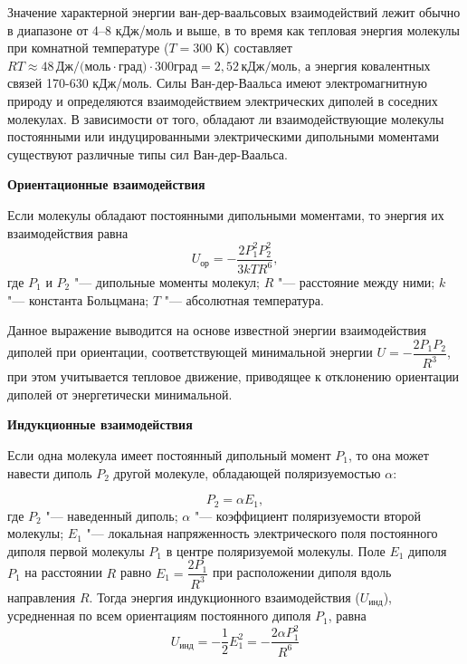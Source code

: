 \documentclass[12pt,a4paper,oneside]{book}
\begin{document}
Значение характерной энергии ван-дер-ваальсовых взаимодействий лежит обычно в диапазоне от 4--8 кДж/моль и выше, в то время как тепловая энергия молекулы при комнатной температуре ($T = 300$ К) составляет $RT \approx 48 \, \text{Дж/(моль} \cdot \text{град)} \cdot 300  \text{град} = 2,52 \, \text{кДж/моль}$, а энергия ковалентных связей 170-630 кДж/моль. Силы Ван-дер-Ваальса имеют электромагнитную природу и определяются взаимодействием электрических диполей в соседних молекулах. В зависимости от того, обладают ли взаимодействующие молекулы постоянными или индуцированными электрическими дипольными моментами существуют различные типы сил Ван-дер-Ваальса.

\textbf{Ориентационные взаимодействия}

Если молекулы обладают постоянными дипольными моментами, то энергия их взаимодействия равна 
\begin{equation}
\label{or} 
 U_\text{ор} = - \dfrac{2P_1^2 P_2^2}{3 k T R^6},
 \end{equation} 
где $ P_1 $ и $ P_2 $ "--- дипольные моменты молекул; $ R $ "--- расстояние между ними; $ k $ "--- константа Больцмана; $T$ "--- абсолютная температура. 

Данное выражение выводится на основе известной энергии взаимодействия диполей при ориентации, соответствующей минимальной энергии $ U = - \dfrac{2P_1 P_2}{ R^3}$, при этом учитывается тепловое движение, приводящее к отклонению ориентации диполей от энергетически минимальной.

\textbf{Индукционные взаимодействия}

Если одна молекула имеет постоянный дипольный момент  $ P_1 $, то она может навести диполь $ P_2 $  другой молекуле, обладающей поляризуемостью $\alpha$:

\begin{equation}
	P_2 = \alpha E_1,
\end{equation}
где $P_2$ "--- наведенный диполь; $ \alpha $ "--- коэффициент поляризуемости второй молекулы; $ E_1 $ "--- локальная напряженность электрического поля постоянного диполя первой молекулы $ P_1 $ в центре поляризуемой молекулы. Поле $ E_1 $ диполя $ P_1 $ на расстоянии $ R $ равно $ E_1 = \dfrac{2 P_1}{R^3} $ при расположении диполя вдоль направления $R$. Тогда энергия индукционного взаимодействия ($ U_{\text{инд}} $), усредненная по всем ориентациям постоянного
диполя $ P_1 $, равна
\begin{equation}
\label{ind} 
U_{\text{инд}} = - \frac{1}{2} E_1^2 = - \dfrac{2 \alpha P_1^2}{R^6} 
\end{equation}
\end{document}
